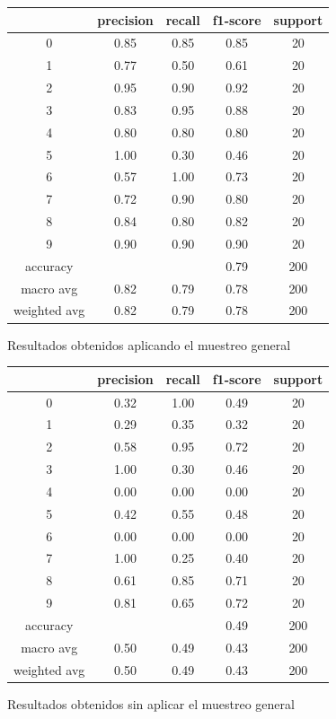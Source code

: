 \begin{figure}[h]
    \label{tab : Muestreo}
    \centering
    \begin{tabular}{| c | c | c | c | c |}
        \hline
         & precision & recall & f1-score & support \\ \hline
        0 & 0.85 & 0.85 & 0.85 & 20 \\ 
        1 & 0.77 & 0.50 & 0.61 & 20 \\ 
        2 & 0.95 & 0.90 & 0.92 & 20 \\ 
        3 & 0.83 & 0.95 & 0.88 & 20 \\ 
        4 & 0.80 & 0.80 & 0.80 & 20 \\ 
        5 & 1.00 & 0.30 & 0.46 & 20 \\ 
        6 & 0.57 & 1.00 & 0.73 & 20 \\ 
        7 & 0.72 & 0.90 & 0.80 & 20 \\ 
        8 & 0.84 & 0.80 & 0.82 & 20 \\ 
        9 & 0.90 & 0.90 & 0.90 & 20 \\ \hline
        accuracy & & & 0.79 & 200 \\
   macro avg & 0.82 & 0.79 & 0.78 & 200 \\ 
weighted avg & 0.82 & 0.79 & 0.78 & 200\\ \hline


    \end{tabular}
    \caption{Resultados obtenidos aplicando el muestreo general}
\end{figure}

\begin{figure}[h]
    \label{tab : sin_muestreo}
    \centering
    \begin{tabular}{| c | c | c | c | c |}
        \hline
         & precision & recall & f1-score & support \\ \hline
         0 & 0.32 & 1.00 & 0.49 & 20 \\
         1 & 0.29 & 0.35 & 0.32 & 20 \\
         2 & 0.58 & 0.95 & 0.72 & 20 \\
         3 & 1.00 & 0.30 & 0.46 & 20 \\
         4 & 0.00 & 0.00 & 0.00 & 20 \\
         5 & 0.42 & 0.55 & 0.48 & 20 \\
         6 & 0.00 & 0.00 & 0.00 & 20 \\
         7 &   1.00   &   0.25 &     0.40 &       20 \\
         8     &  0.61   &   0.85 &     0.71 &       20 \\
         9      & 0.81   &   0.65 &     0.72 &       20 \\ \hline

  accuracy & & &           0.49  &     200 \\
 macro avg   &    0.50  &    0.49  &    0.43   &    200 \\
weighted avg  &     0.50    &  0.49   &   0.43   &    200 \\ \hline


    \end{tabular}
    \caption{Resultados obtenidos sin aplicar el muestreo general}
\end{figure}

